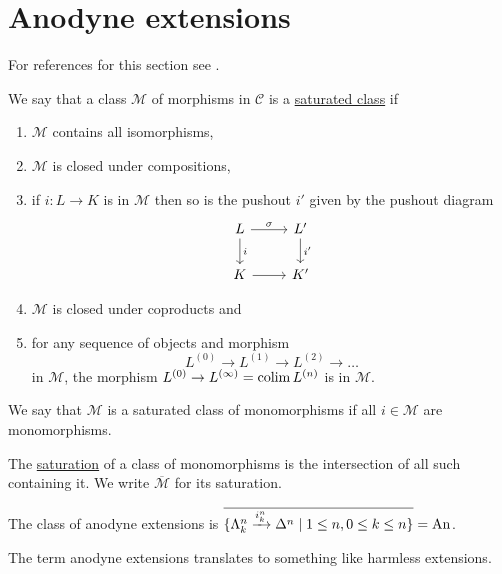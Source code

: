 \section{Anodyne extensions}

For references for this section see \cite[Section I.4]{GoerSimp1999}.

\begin{defi}
    We say that a class $\mathcal{M}$ of morphisms in $\mathcal{C}$ is a \underline{saturated class} if 
    \begin{enumerate}
        \item 
        $\mathcal{M}$ contains all isomorphisms,
        \item 
        $\mathcal{M}$ is closed under compositions,
        \item
        if $i:L \to K$ is in $\mathcal{M}$ then so is the pushout $i'$ given by the pushout diagram 
        \[
        \begin{tikzcd}
            L
            \arrow[d,"i"]
            \ar[r,"\sigma"]
            &
            L'
            \ar[d,"i'"]
            \\
            K
            \ar[r]
            &
            K'   
        \end{tikzcd}
        \]
        \item
        $\mathcal{M}$ is closed under coproducts and
        \item 
        for any sequence of objects and morphism 
        \[
        L^{(0)} \to L^{(1)} \to L^{(2)}\to \dotsc
        \]
        in $\mathcal{M}$, the morphism $L^{(0)} \to L^{(\infty)}=\operatorname{colim} L^{(n)}$ is in $\mathcal{M}$.
    \end{enumerate}
    We say that $\mathcal{M}$ is a saturated class of monomorphisms if all $i \in \mathcal{M}$ are monomorphisms.
\end{defi}

\begin{defi}
    The \underline{saturation} of a class of monomorphisms is the intersection of all such containing it. We write $\overline{\mathcal{M}}$ for its saturation.
\end{defi}

\begin{defi}
    The class of anodyne extensions is $\overline{\{ \Lambda_k^n \xrightarrow{i_k^n} \Delta^n \mid 1 \leq n ,0 \leq k \leq n \}}=\operatorname{An}$.
\end{defi}

\begin{rmk}
    The term anodyne extensions translates to something like harmless extensions.
\end{rmk}

